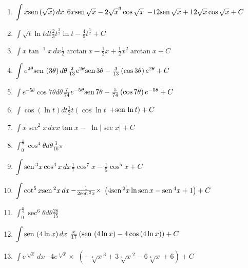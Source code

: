 {\begin{enumerate}
\item {$\displaystyle{\int x\text{\rm sen}\,(\sqrt{x})\, dx}$}{ $6x\text{\rm sen}\, \sqrt{x}-2\sqrt{x}^{3}\cos \sqrt{x}$ $-12\text{\rm sen}\, \sqrt{x}+12\sqrt{x}\cos \sqrt{x}+C$}

\item {$\displaystyle{\int \sqrt{t}\ln tdt}$}{$\frac{2}{3}t^{\frac{3}{2}}\ln t-\frac{4}{9}t^{\frac{3}{2}}+C$}

\item {$\displaystyle{\int x\tan ^{-1}x\, dx}$}{$\frac{1}{2}\arctan x-\frac{1}{2}x+\frac{1}{2}x^{2}\arctan x+C$}

\item {$\displaystyle{\int e^{2\theta }\text{\rm sen}\,\left( 3\theta \right) d\theta }$}{$\frac{2}{13}e^{2\theta }\text{\rm sen}\, 3\theta -\frac{3}{13}\left( \cos 3\theta \right) e^{2\theta}+C $}

\item {$\displaystyle{\int e^{-5\theta }\cos 7\theta d\theta }$}{$\frac{7}{74}e^{-5\theta }\text{\rm sen}\,7\theta -\frac{5}{74}\left( \cos 7\theta \right) e^{-5\theta }+C $}

\item {$\displaystyle{\int \cos \left( \ln t\right) dt}$}{$\frac{1}{2}t \left(\cos\ln t\right.$ \linebreak $\left. +\text{\rm sen}\,\ln t\right) +C$}

\item {$\displaystyle{\int x\sec ^{2}x\, dx}$}{$x\tan x-$ $\ln \left\vert \sec x\right\vert +C$}

\item {$\displaystyle{\int_{0}^{\frac{\pi }{2}}\cos ^{4}\theta d\theta }$}{$\frac{3}{16}\pi $}

\item {$\displaystyle{\int \text{\rm sen}\,^{3}x\cos ^{4}x\, dx}$}{$\frac{1}{7}\cos ^{7}x-\frac{1}{5}\cos^{5}x+C $}

\item {$\displaystyle{\int \cot ^{5}x\text{\rm sen}\,^{2}x\, dx}$}{$-\frac{1}{2\text{\rm sen}\, ^{2}x}\times$ \linebreak $\left( 4\text{\rm sen}\, ^{2}x\ln\text{\rm sen}\, x-\text{\rm sen}\, ^{4}x+1\right)+C $}

\item {$\displaystyle{\int_{0}^{\frac{\pi }{4}}\sec ^{6}\theta d\theta}$}{$\frac{28}{15}$}

\item {$\displaystyle{\int \text{\rm sen}\,\left( 4\ln x\right) dx}$}{ $\frac{x}{17}\left( \text{\rm sen}\, \left( 4\ln x\right) -4\cos \left( 4\ln x\right) \right)+C$}

\item {$\displaystyle{\int e^{\sqrt[4]{x}}\, dx}$}{$-4e^{\sqrt[4]{x}}\times$ \linebreak $\left( -\sqrt[4]{x}^{3}+3\sqrt[4]{x}^{2}-6\sqrt[4]{x}+6\right)+C $ }


\end{enumerate}}
